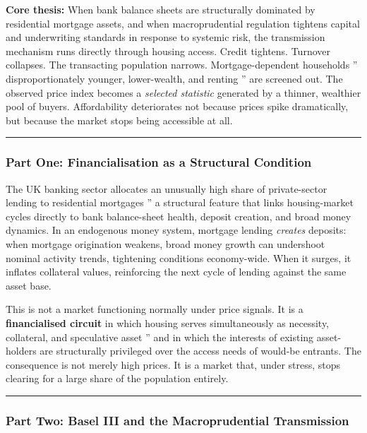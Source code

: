 \documentclass[
]{article}
\begin{document}
\textbf{Core thesis:} When bank balance sheets are structurally
dominated by residential mortgage assets, and when macroprudential
regulation tightens capital and underwriting standards in response to
systemic risk, the transmission mechanism runs directly through housing
access. Credit tightens. Turnover collapses. The transacting population
narrows. Mortgage-dependent households '' disproportionately younger,
lower-wealth, and renting '' are screened out. The observed price index
becomes a \emph{selected statistic} generated by a thinner, wealthier
pool of buyers. Affordability deteriorates not because prices spike
dramatically, but because the market stops being accessible at all.

\begin{center}\rule{0.5\linewidth}{0.5pt}\end{center}

\subsubsection{Part One: Financialisation as a Structural
Condition}\label{part-one-financialisation-as-a-structural-condition}

The UK banking sector allocates an unusually high share of
private-sector lending to residential mortgages '' a structural feature
that links housing-market cycles directly to bank balance-sheet health,
deposit creation, and broad money dynamics. In an endogenous money
system, mortgage lending \emph{creates} deposits: when mortgage
origination weakens, broad money growth can undershoot nominal activity
trends, tightening conditions economy-wide. When it surges, it inflates
collateral values, reinforcing the next cycle of lending against the
same asset base.

This is not a market functioning normally under price signals. It is a
\textbf{financialised circuit} in which housing serves simultaneously as
necessity, collateral, and speculative asset '' and in which the
interests of existing asset-holders are structurally privileged over the
access needs of would-be entrants. The consequence is not merely high
prices. It is a market that, under stress, stops clearing for a large
share of the population entirely.

\begin{center}\rule{0.5\linewidth}{0.5pt}\end{center}

\subsubsection{Part Two: Basel III and the Macroprudential
Transmission}\label{part-two-basel-iii-and-the-macroprudential-transmission}
\end{document}
